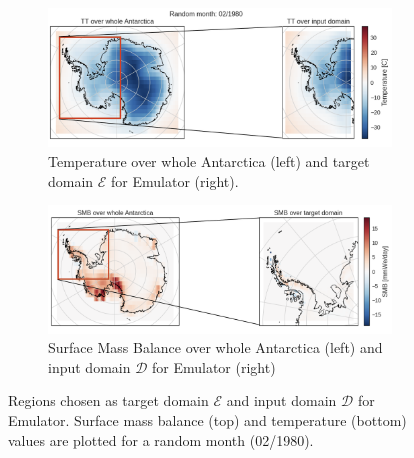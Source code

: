 \documentclass[a4paper,11pt,oneside]{report}
\begin{document}
\begin{figure}[tbp]
        \centering
        \begin{subfigure}[b]{\columnwidth}
            \centering \includegraphics[width=\textwidth]{images/input_domain.png}
            \caption[]%
            {{\small Temperature over whole Antarctica (left) and target domain $\mathcal{E}$ for Emulator (right). }}    
          \label{fig:rdpoints-RCM}
        \end{subfigure}
        \hfill
        \begin{subfigure}[b]{\columnwidth}  
            \centering 
            \includegraphics[width=\textwidth]{images/target_domain.png}
            \caption[]%
            {{\small Surface Mass Balance over whole Antarctica (left) and input domain $\mathcal{D}$ for Emulator (right)}}  
            \label{fig:timeseries-RCM}
        \end{subfigure}
        \hfill
        \caption[]
        {\small Regions chosen as target domain $\mathcal{E}$ and input domain $\mathcal{D}$ for Emulator. Surface mass balance (top) and temperature (bottom) values are plotted for a random month (02/1980). } 
        \label{fig:region-of-choice}
    \end{figure}
\end{document}
